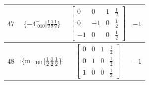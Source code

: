 \documentclass[fleqn,8pt]{jsarticle}
\begin{document}
\begin{longtable}{cccc}
$ 47 $ & $ \{-4^{-}_{\,\,010}|\frac{1}{2} \frac{1}{2} \frac{1}{2}\} $ & $ \begin{bmatrix} 0 & 0 & 1 & \frac{1}{2} \\ 0 & -1 & 0 & \frac{1}{2} \\ -1 & 0 & 0 & \frac{1}{2} \end{bmatrix} $ & $ -1 $ \\ \hline
$ 48 $ & $ \{{\rm m}_{-101}|\frac{1}{2} \frac{1}{2} \frac{1}{2}\} $ & $ \begin{bmatrix} 0 & 0 & 1 & \frac{1}{2} \\ 0 & 1 & 0 & \frac{1}{2} \\ 1 & 0 & 0 & \frac{1}{2} \end{bmatrix} $ & $ -1 $ \\
\end{longtable}
\end{document}

